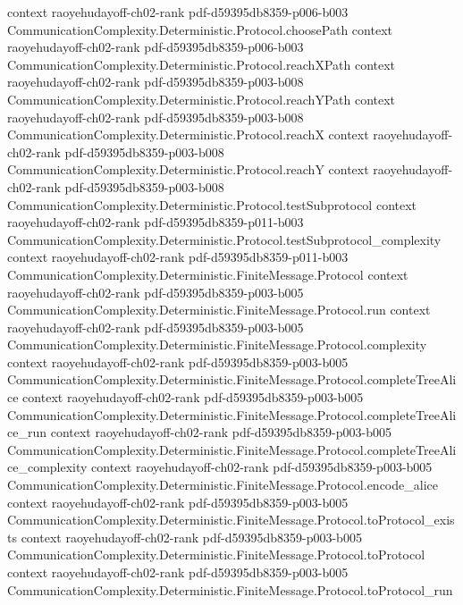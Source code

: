\begin{theorem}
  {context}
  {raoyehudayoff-ch02-rank}
  {pdf-d59395db8359-p006-b003}
\proofstep
  {CommunicationComplexity.Deterministic.Protocol.choosePath}
  {context}
  {raoyehudayoff-ch02-rank}
  {pdf-d59395db8359-p006-b003}
\proofstep
  {CommunicationComplexity.Deterministic.Protocol.reachXPath}
  {context}
  {raoyehudayoff-ch02-rank}
  {pdf-d59395db8359-p003-b008}
\proofstep
  {CommunicationComplexity.Deterministic.Protocol.reachYPath}
  {context}
  {raoyehudayoff-ch02-rank}
  {pdf-d59395db8359-p003-b008}
\proofstep
  {CommunicationComplexity.Deterministic.Protocol.reachX}
  {context}
  {raoyehudayoff-ch02-rank}
  {pdf-d59395db8359-p003-b008}
\proofstep
  {CommunicationComplexity.Deterministic.Protocol.reachY}
  {context}
  {raoyehudayoff-ch02-rank}
  {pdf-d59395db8359-p003-b008}
\proofstep
  {CommunicationComplexity.Deterministic.Protocol.testSubprotocol}
  {context}
  {raoyehudayoff-ch02-rank}
  {pdf-d59395db8359-p011-b003}
\proofstep
  {CommunicationComplexity.Deterministic.Protocol.testSubprotocol_complexity}
  {context}
  {raoyehudayoff-ch02-rank}
  {pdf-d59395db8359-p011-b003}
\proofstep
  {CommunicationComplexity.Deterministic.FiniteMessage.Protocol}
  {context}
  {raoyehudayoff-ch02-rank}
  {pdf-d59395db8359-p003-b005}
\proofstep
  {CommunicationComplexity.Deterministic.FiniteMessage.Protocol.run}
  {context}
  {raoyehudayoff-ch02-rank}
  {pdf-d59395db8359-p003-b005}
\proofstep
  {CommunicationComplexity.Deterministic.FiniteMessage.Protocol.complexity}
  {context}
  {raoyehudayoff-ch02-rank}
  {pdf-d59395db8359-p003-b005}
\proofstep
  {CommunicationComplexity.Deterministic.FiniteMessage.Protocol.completeTreeAlice}
  {context}
  {raoyehudayoff-ch02-rank}
  {pdf-d59395db8359-p003-b005}
\proofstep
  {CommunicationComplexity.Deterministic.FiniteMessage.Protocol.completeTreeAlice_run}
  {context}
  {raoyehudayoff-ch02-rank}
  {pdf-d59395db8359-p003-b005}
\proofstep
  {CommunicationComplexity.Deterministic.FiniteMessage.Protocol.completeTreeAlice_complexity}
  {context}
  {raoyehudayoff-ch02-rank}
  {pdf-d59395db8359-p003-b005}
\proofstep
  {CommunicationComplexity.Deterministic.FiniteMessage.Protocol.encode_alice}
  {context}
  {raoyehudayoff-ch02-rank}
  {pdf-d59395db8359-p003-b005}
\proofstep
  {CommunicationComplexity.Deterministic.FiniteMessage.Protocol.toProtocol_exists}
  {context}
  {raoyehudayoff-ch02-rank}
  {pdf-d59395db8359-p003-b005}
\proofstep
  {CommunicationComplexity.Deterministic.FiniteMessage.Protocol.toProtocol}
  {context}
  {raoyehudayoff-ch02-rank}
  {pdf-d59395db8359-p003-b005}
\proofstep
  {CommunicationComplexity.Deterministic.FiniteMessage.Protocol.toProtocol_run}

\end{theorem}
